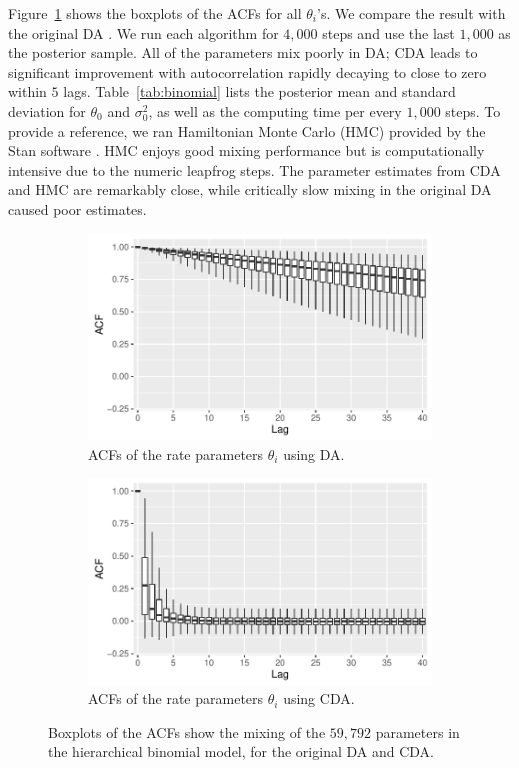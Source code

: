 \documentclass[10pt]{article}
\begin{document}
Figure~\ref{data_binomial} shows the boxplots of the ACFs for all $\theta_i$'s. We compare the result with the original DA \citep{polson2013bayesian}. We run each algorithm for $4,000$ steps and use the last $1,000$ as the posterior sample. All of the parameters mix poorly in DA; CDA leads to significant improvement with autocorrelation rapidly decaying to close to zero within $5$ lags. Table~\ref{tab:binomial} lists the posterior mean and standard deviation for $\theta_0$ and $\sigma_0^2$, as well as the computing time per every $1,000$ steps. To provide a reference, we ran Hamiltonian Monte Carlo (HMC) provided by the Stan software \citep{carpenter2016stan}. HMC enjoys good mixing performance but is computationally intensive due to the numeric leapfrog steps. The parameter estimates from CDA and HMC are remarkably close, while critically slow mixing in the original DA caused poor estimates.


 \begin{figure}[H]
   \begin{subfigure}[b]{0.45\textwidth}
 \includegraphics[width=1\textwidth]{binomial_random_acf_da.pdf}
 \caption{ACFs of the rate parameters $\theta_i$ using DA.}
 \end{subfigure}
  \hfill 
 \begin{subfigure}[b]{0.45\textwidth}
 \includegraphics[width=1\textwidth]{binomial_random_acf_cda.pdf}
 \caption{ACFs of the rate parameters $\theta_i$ using CDA.}
 \end{subfigure} 
 \caption{Boxplots of the ACFs show the mixing of the $59,792$ parameters in the hierarchical binomial model, for the original DA\citep{polson2013bayesian} and CDA.}
 \label{data_binomial}
 \end{figure}
 
\end{document}
